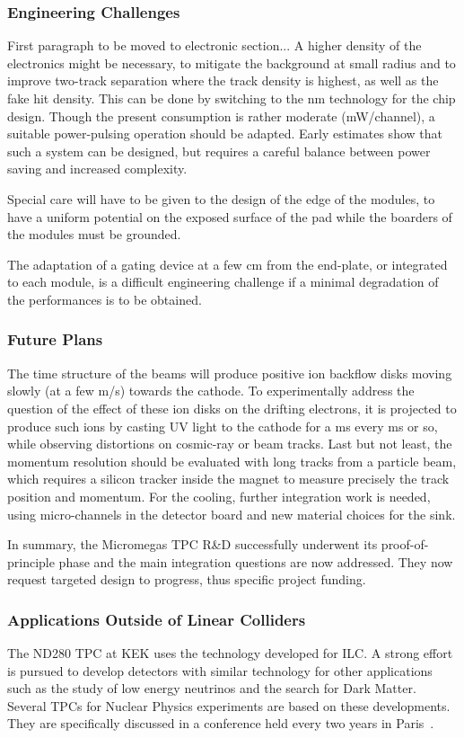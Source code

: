 \subsubsection{Engineering Challenges}
First paragraph to be moved to electronic section...
A higher density of the electronics might be necessary, to mitigate the background at small radius and to improve two-track separation
where the track density is highest, as well as the fake hit density. This can be done by switching to the \unit[65]{nm} technology for the
chip design. Though the present consumption is rather moderate (\unit[15]{mW/channel}), a suitable power-pulsing operation should be adapted.
Early estimates show that such a system can be designed, but requires a careful balance between power saving and increased complexity.

Special care will have to be given to the design of the edge of the modules, to have a uniform potential on the exposed surface of the pad while the boarders of the modules must be grounded.

The adaptation of a gating device at a few cm from the end-plate, or integrated to each module, is a
difficult engineering challenge if a minimal degradation of the performances is to be obtained.


\subsubsection{Future Plans}
The time structure of the beams will produce positive ion backflow disks moving slowly (at a few \unit[1]{m/s}) towards the cathode. To experimentally address the question of the effect of these ion disks on the drifting electrons, it is projected to produce such
ions by casting UV light to the cathode for a ms every \unit[100]{ms} or so, while observing distortions on cosmic-ray or beam tracks.
Last but not least, the momentum resolution should be evaluated with long tracks from a particle beam, which requires a silicon
tracker inside the magnet to measure precisely the track position and momentum. For the cooling, further integration work is needed, using micro-channels in the detector board and new material choices for the sink.

In summary, the Micromegas TPC R\&D successfully underwent its proof-of-principle phase and the main integration questions are now addressed. They now request targeted design to progress, thus specific project funding.


\subsubsection{Applications Outside of Linear Colliders}
The ND280 TPC at KEK uses the technology developed for ILC.
A strong effort is pursued to develop detectors with similar technology for other applications such as
the study of low energy neutrinos and the search for Dark Matter.
Several TPCs for Nuclear Physics experiments are based on these developments. They are specifically discussed in a
conference held every two years in Paris~\cite{Irastorza:2013mxa}.
